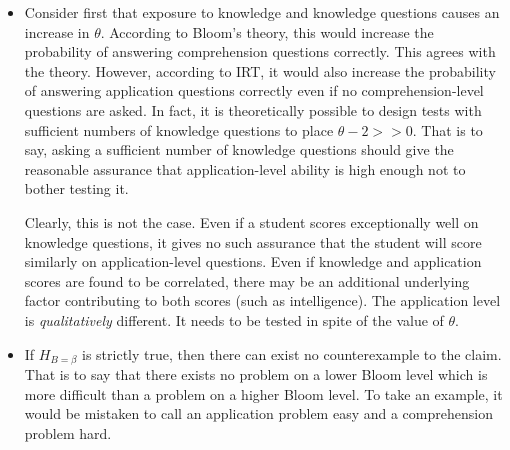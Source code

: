 \documentclass[a4paper,twocolumn]{article}
\begin{document}
\begin{itemize} 

\item Consider first that exposure to knowledge and knowledge questions causes
an increase in $\theta$.  According to Bloom's theory, this would increase the
probability of answering comprehension questions correctly.  This agrees with
the theory.  However, according to IRT, it would also increase the probability
of answering application questions correctly even if no comprehension-level
questions are asked.  In fact, it is theoretically possible to design tests
with sufficient numbers of knowledge questions to place $\theta-2 >> 0$.  That
is to say, asking a sufficient number of knowledge questions should give the
reasonable assurance that application-level ability is high enough not to
bother testing it.

Clearly, this is not the case. Even if a student scores exceptionally well on
knowledge questions, it gives no such assurance that the student will score
similarly on application-level questions.  Even if knowledge and application
scores are found to be correlated, there may be an additional underlying factor
contributing to both scores (such as intelligence).  The application level is
\emph{qualitatively} different.  It needs to be tested in spite of the value
of $\theta$.

% 

\item If $H_{B=\beta}$ is strictly true, then there can exist no counterexample
to the claim.  That is to say that there exists no problem on a lower Bloom
level which is more difficult than a problem on a higher Bloom level.  To take
an example, it would be mistaken to call an application problem easy and a
comprehension problem hard. 


\end{itemize}
\end{document}
